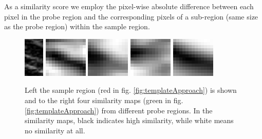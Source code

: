 \documentclass[10pt,twocolumn,letterpaper]{article}
\begin{document}
As a similarity score we employ the pixel-wise absolute difference between each pixel in the probe region and the corresponding pixels of a sub-region (same size as the probe region) within the sample region.

\begin{figure}
	\begin{center}		
		\includegraphics[width=0.09\linewidth]{img/sample}
		\hspace{0.05\linewidth}
		\includegraphics[width=0.2\linewidth]{img/diff1}
		\includegraphics[width=0.2\linewidth]{img/diff2}
		\includegraphics[width=0.2\linewidth]{img/diff3}
		\includegraphics[width=0.2\linewidth]{img/diff4}
	\end{center}
	\caption{Left the sample region (red in fig. \ref{fig:templateApproach}) is shown and to the right four similarity maps (green in fig. \ref{fig:templateApproach}) from different probe regions. In the similarity maps, black indicates high similarity, while white means no similarity at all. }
	\label{fig:sampleAndSimScores}
\end{figure}
\end{document}
